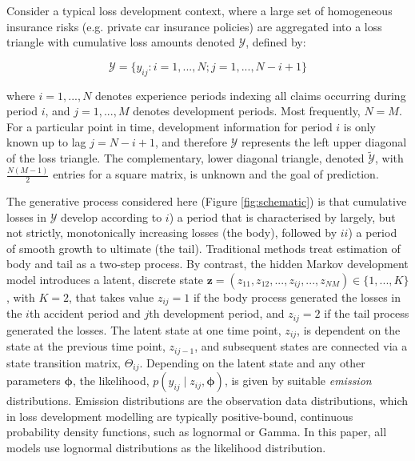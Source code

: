 Consider a typical loss development context, where
a large set of homogeneous insurance risks (e.g. private
car insurance policies) are aggregated
into a loss triangle with
cumulative loss amounts denoted
$\mathcal{Y}$, defined by:

\begin{equation}
	\mathcal{Y} = \{y_{ij} : i = 1, ..., N; j = 1, ..., N - i + 1\}
\end{equation}

where $i = 1, ..., N$ denotes experience periods 
indexing all claims occurring during period $i$, and $j = 1, ..., M$
denotes development periods. 
Most frequently, $N = M$.
For a particular point in time,
development information for period $i$ is only known up to lag 
$j = N - i + 1$,
and therefore $\mathcal{Y}$ represents the left upper diagonal of
the loss triangle. The complementary, lower diagonal 
triangle, denoted $\tilde{\mathcal{Y}}$,
with $\frac{N (M - 1)}{2}$ entries 
for a square matrix,
is unknown and the goal of prediction.

The generative process considered here (Figure \ref{fig:schematic})
is that cumulative losses
in $\mathcal{Y}$ develop according to $i$) a period that is
characterised by largely, but not strictly, monotonically 
increasing losses 
(the body), followed by $ii$) a period of smooth
growth to ultimate (the tail). Traditional methods
treat estimation of body and tail as a two-step process.
By contrast, the hidden Markov development model introduces a
latent, discrete state $\bm{z} = (z_{11}, z_{12}, ..., z_{ij}, ..., z_{NM})
\in \{1, ...,  K\}$, with $K = 2$, that takes value
$z_{ij} = 1$ if the body process generated the losses in the $i$th
accident period and $j$th development period, and
$z_{ij} = 2$ if the tail process generated the losses.
The latent state at one time point, $z_{ij}$, is dependent
on the state at the previous time point, $z_{ij-1}$,
and subsequent states are connected via a state transition
matrix, $\Theta_{ij}$.
Depending on the latent state and any other parameters
$\bm{\phi}$, the likelihood, $p(y_{ij} \mid z_{ij}, \bm{\phi})$,
is given by suitable \textit{emission} distributions.
Emission distributions are the observation data distributions,
which in loss development modelling are typically
positive-bound, continuous probability density
functions, such as lognormal or Gamma.
In this paper, all models use lognormal distributions
as the likelihood distribution.

